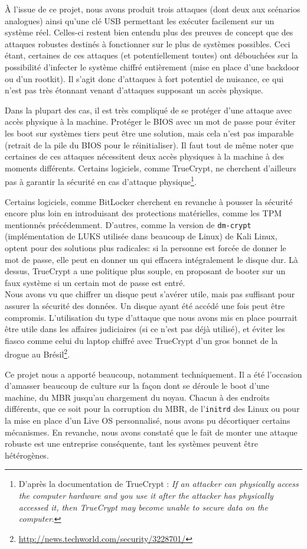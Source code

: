 \documentclass[12pt,a4paper]{article}
\begin{document}
À l'issue de ce projet, nous avons produit trois attaques (dont deux aux
scénarios analogues) ainsi qu'une clé USB permettant les exécuter facilement
sur un système réel. Celles-ci restent bien entendu plus des preuves
de concept que des attaques robustes destinés à fonctionner sur le plus de
systèmes possibles. Ceci étant, certaines de ces attaques (et potentiellement
toutes) ont débouchées sur la possibilité d'infecter le système chiffré
entièrement (mise en place d'une backdoor ou d'un rootkit). Il s'agit donc
d'attaques à fort potentiel de nuisance, ce qui n'est pas très étonnant venant
d'attaques supposant un accès physique.

Dans la plupart des cas, il est très compliqué de se protéger d'une attaque
avec accès physique à la machine. Protéger le BIOS avec un mot de passe pour
éviter les boot sur systèmes tiers peut être une solution, mais cela n'est pas
imparable (retrait de la pile du BIOS pour le réinitialiser). Il faut tout de
même noter que certaines de ces attaques nécessitent deux accès physiques à la
machine à des moments différents. Certains logiciels, comme TrueCrypt, ne 
cherchent d'ailleurs pas à garantir la sécurité en cas d'attaque
physique\footnote{D'après la documentation de TrueCrypt : \og \textit{If an
attacker can physically access the computer hardware and you use it after the
attacker has physically accessed it, then TrueCrypt may become unable to secure
data on the computer}.\fg}.

Certains logiciels, comme BitLocker cherchent en revanche à pousser la sécurité
encore plus loin en introduisant des protections matérielles, comme les TPM 
mentionnés précédemment. D'autres, comme la version de \texttt{dm-crypt} (implémentation
de LUKS utilisée dans beaucoup de Linux) de Kali Linux, optent pour des solutions
plus radicales: si la personne est forcée de donner le mot de passe, elle peut
en donner un qui effacera intégralement le disque dur. Là dessus, TrueCrypt a une politique
plus souple, en proposant de booter sur un \og faux \fg système si un certain
mot de passe est entré.\\

Nous avons vu que chiffrer un disque peut s'avérer utile, mais pas suffisant
pour assurer la sécurité des données. Un disque ayant été accédé une fois peut
être compromis. L'utilisation du type d'attaque que nous avons mis en place
pourrait être utile dans les affaires judiciaires (si ce n'est pas déjà
utilisé), et éviter les fiasco comme celui du laptop chiffré avec TrueCrypt
d'un gros bonnet de la drogue au
Brésil\footnote{\url{http://news.techworld.com/security/3228701/}}.

Ce projet nous a apporté beaucoup, notamment techniquement. Il a été l'occasion
d'amasser beaucoup de culture sur la façon dont se déroule le boot d'une machine,
du MBR jusqu'au chargement du noyau. Chacun à des endroits différents, que ce
soit pour la corruption du MBR, de l'\texttt{initrd} des Linux ou pour la mise en place
d'un Live OS personnalisé, nous avons pu décortiquer certains mécanismes. En
revanche, nous avons constaté que le fait de monter une attaque robuste est une
entreprise conséquente, tant les systèmes peuvent être hétérogènes.
\end{document}
